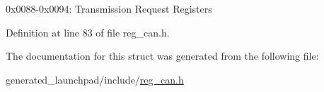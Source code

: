 0x0088-\/0x0094\+: Transmission Request Registers 

Definition at line 83 of file reg\+\_\+can.\+h.



The documentation for this struct was generated from the following file\+:\begin{DoxyCompactItemize}
\item 
generated\+\_\+launchpad/include/\mbox{\hyperlink{reg__can_8h}{reg\+\_\+can.\+h}}\end{DoxyCompactItemize}
